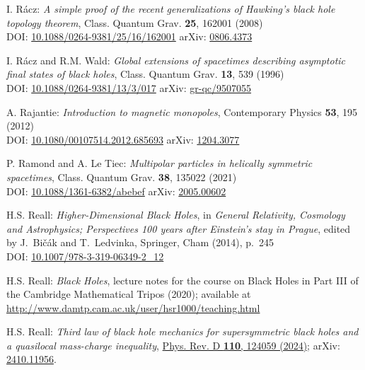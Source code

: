 \begin{thebibliography}{123}
I. R\'acz:
{\em A simple proof of the recent generalizations of Hawking's black hole topology theorem},
Class. Quantum Grav. {\bf 25}, 162001 (2008)\\
DOI: \href{https://doi.org/10.1088/0264-9381/25/16/162001}{10.1088/0264-9381/25/16/162001}\hfill
arXiv: \href{https://arxiv.org/abs/0806.4373}{0806.4373}

I. R\'acz and R.M. Wald:
{\em Global extensions of spacetimes describing asymptotic final states of black holes},
Class. Quantum Grav. {\bf 13}, 539 (1996)\\
DOI: \href{https://doi.org/10.1088/0264-9381/13/3/017}{10.1088/0264-9381/13/3/017}\hfill
arXiv: \href{https://arxiv.org/abs/gr-qc/9507055}{gr-qc/9507055}

A. Rajantie:
{\em Introduction to magnetic monopoles},
Contemporary Physics {\bf 53}, 195 (2012)\\
DOI: \href{https://doi.org/10.1080/00107514.2012.685693}{10.1080/00107514.2012.685693}\hfill
arXiv: \href{https://arxiv.org/abs/1204.3077}{1204.3077}

P. Ramond and A. Le Tiec:
{\em Multipolar particles in helically symmetric spacetimes},
Class. Quantum Grav. {\bf 38}, 135022 (2021)\\
DOI: \href{https://doi.org/10.1088/1361-6382/abebef}{10.1088/1361-6382/abebef}\hfill
arXiv: \href{https://arxiv.org/abs/2005.00602}{2005.00602}

H.S. Reall:
{\em Higher-Dimensional Black Holes},
in {\em  General Relativity, Cosmology and Astrophysics; Perspectives 100 years after Einstein's stay in Prague}, edited by J.~Bičák and T.~Ledvinka,
Springer, Cham (2014), p.~245\\
DOI: \href{https://doi.org/10.1007/978-3-319-06349-2_12}{10.1007/978-3-319-06349-2\_12}

H.S. Reall: {\em Black Holes}, lecture notes for the course on Black Holes in
Part III of the Cambridge Mathematical Tripos (2020); available at\\
\url{http://www.damtp.cam.ac.uk/user/hsr1000/teaching.html}

H.S. Reall:
{\em Third law of black hole mechanics for supersymmetric black holes and a quasilocal mass-charge inequality},
\href{https://doi.org/10.1103/PhysRevD.110.124059}{Phys. Rev. D {\bf 110}, 124059 (2024)};
arXiv: \href{https://arxiv.org/abs/2410.11956}{2410.11956}.


\end{thebibliography}

